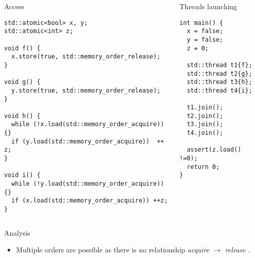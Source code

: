 \begin{frame}[t,fragile]
\begin{columns}

\begin{column}{.6\textwidth}
\begin{block}{Access}
\begin{lstlisting}[basicstyle=\tiny]
std::atomic<bool> x, y;
std::atomic<int> z;

void f() {
  x.store(true, std::memory_order_release);
}

void g() {
  y.store(true, std::memory_order_release);
}

void h() {
  while (!x.load(std::memory_order_acquire)) {}
  if (y.load(std::memory_order_acquire))  ++ z;
}

void i() {
  while (!y.load(std::memory_order_acquire)) {}
  if (x.load(std::memory_order_acquire)) ++z;
}
\end{lstlisting}
\end{block}
\end{column}

\begin{column}{.4\textwidth}
\begin{block}{Threads launching}
\begin{lstlisting}[basicstyle=\tiny]
int main() {
  x = false;
  y = false;
  z = 0;

  std::thread t1{f};
  std::thread t2{g};
  std::thread t3{h};
  std::thread t4{i};

  t1.join();
  t2.join();
  t3.join();
  t4.join();

  assert(z.load() !=0);
  return 0;
}
\end{lstlisting}
\end{block}
\end{column}

\end{columns}
\end{frame}

\begin{frame}[t]{Analysis}


\begin{itemize}
  \item Multiple orders are possible as there is no relationship
         \emph{acquire} $\rightarrow$ \emph{release} .
\end{itemize}
\end{frame}

